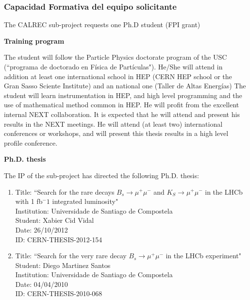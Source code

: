 %
%

\subsubsection*{Capacidad Formativa del equipo solicitante}

The CALREC sub-project requests one Ph.D student (FPI grant)

{\bf Training program}

The student will follow the Particle Physics doctorate program of the USC (``programa de doctorado en F\'isica de Part\'iculas"). 
He/She will attend in addition at least one international school in HEP (CERN HEP school or the Gran Sasso Sciente Institute) and an national one (Taller de Altas Energ\'ias) 
The student will learn instrumentation in HEP, and high level programming and the use of mathematical method common in HEP. He will profit from the excellent internal NEXT collaboration.
It is expected that he will attend and present his results in the NEXT meetings.
He will attend (at least two) international conferences or workshops, and will present this thesis results in a high level profile conference.

{\bf Ph.D. thesis}

The IP of the sub-project has directed the following Ph.D. thesis:
\begin{enumerate}

\item Title: ``Search for the rare decays $B_s \to \mu^+\mu^-$
and $K_S \to \mu^+\mu^-$ in the LHCb with 1 fb$^-1$ integrated luminosity" \\
Institution: Universidade de Santiago de Compostela \\
Student: Xabier Cid Vidal \\
Date: 26/10/2012 \\
ID: CERN-THESIS-2012-154  

\item Title: ``Search for the very rare decay $B_s \to \mu^+\mu^-$ in the LHCb experiment" \\
Student: Diego Martinez Santos \\
Institution: Universidade de Santiago de Compostela \\
Date: 04/04/2010 \\
ID: CERN-THESIS-2010-068 

\end{enumerate}

